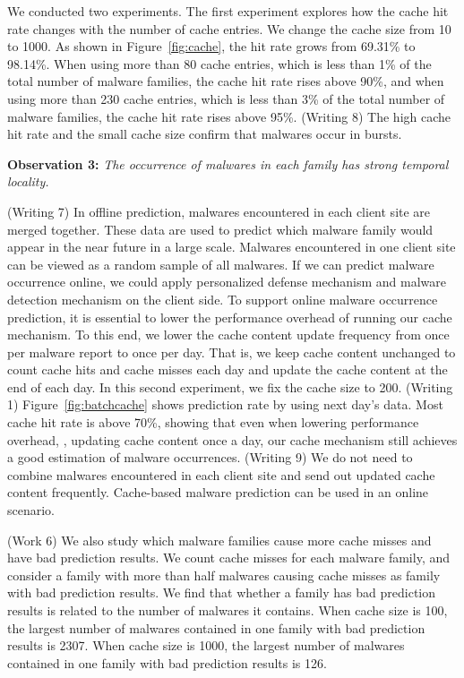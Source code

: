 We conducted two experiments. 
The first experiment explores how the cache hit rate changes with the number of cache entries. 
We change the cache size from 10 to 1000. 
As shown in Figure~\ref{fig:cache}, the hit rate grows from 69.31\% to 98.14\%. 
When using more than 80 cache entries, which is less than 1\% of the total number of malware families, the cache hit rate rises above 90\%, 
and when using more than 230 cache entries, which is less than 3\% of the total number of malware families, 
the cache hit rate rises above 95\%. 
{\color{red} (Writing 8)
The high cache hit rate and the small cache size confirm that malwares occur in bursts.
}

{\bf Observation 3:} 
{\em The occurrence of malwares in each family has strong temporal locality.}  

{\color{red} (Writing 7)
In offline prediction, malwares encountered in each client site are merged together. 
These data are used to predict which malware family would appear in the near future in a large scale.
Malwares encountered in one client site can be viewed as a random sample of all malwares. 
If we can predict malware occurrence online, we could apply personalized defense mechanism and malware detection mechanism on the client side. 
}
To support online malware occurrence prediction, it is essential to lower the 
performance overhead of running our cache mechanism.
To this end, we lower the cache content update frequency from once per malware report to once per day.
That is, we keep cache content unchanged to count cache hits and cache misses each day and update the cache content at the end of each day.
In this second experiment, we fix the cache size to 200. 
{\color{red} (Writing 1)
Figure~\ref{fig:batchcache} shows prediction rate by using next day’s data. 
Most cache hit rate is above 70\%,
showing that even when lowering performance overhead, \ie, updating cache content once a day, 
our cache mechanism still achieves a good estimation of malware occurrences.
}   
{\color{red} (Writing 9)
We do not need to combine malwares encountered in each client site and send out updated cache content frequently. Cache-based malware prediction can be used in an online scenario. 
}

{\color{red} (Work 6)
We also study which malware families cause more cache misses 
and have bad prediction results. 
We count cache misses for each malware family, 
and consider a family with more than half malwares causing cache misses as family with bad prediction results. 
We find that whether a family has bad prediction results is related to the number of malwares it contains. 
When cache size is 100, the largest number of malwares contained in one family with bad prediction results is 2307. 
When cache size is 1000, the largest number of malwares contained in one family with bad prediction results is 126. 
}


